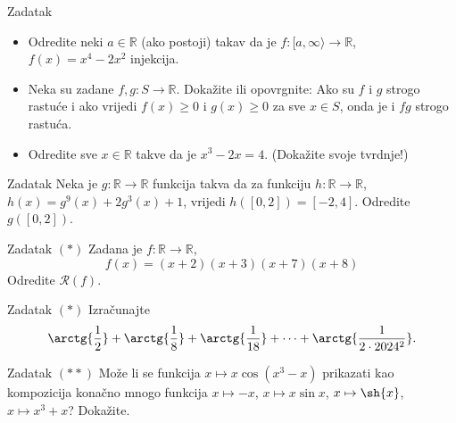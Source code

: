 \begin{exercise}{Zadatak} \textbf{}
\begin{itemize}
\item[a)] Odredite neki \(a\in\mathbb{R}\) (ako postoji) takav da je \(f : [a, \infty\rangle\to \mathbb{R}\), \(f(x)=x^4-2x^2\) injekcija.
\item[b)] Neka su zadane \(f, g : S\to \mathbb{R}\). Dokažite ili opovrgnite: Ako su \(f\) i \(g\) strogo rastuće i ako vrijedi \(f(x)\geq 0\) i \(g(x)\geq 0\) za sve \(x\in S\), onda je i \(fg\) strogo rastuća.
\item[c)] Odredite sve \(x\in \mathbb{R}\) takve da je \(x^3-2x=4\). (Dokažite svoje tvrdnje!)
\end{itemize}
\end{exercise}
\begin{exercise}{Zadatak}
Neka je \(g : \mathbb{R}\to \mathbb{R}\) funkcija takva da za funkciju \(h : \mathbb{R}\to \mathbb{R}\), \(h(x)=g^9(x)+2g^3(x)+1\), vrijedi \(h\left([0, 2]\right)=[-2, 4]\). Odredite \(g\left([0, 2]\right)\).
\end{exercise}
\begin{exercise}{Zadatak} \((*)\)
Zadana je \(f : \mathbb{R}\to \mathbb{R}\),
\[f(x)=(x+2)(x+3)(x+7)(x+8)\]
Odredite \(\mathcal{R}(f)\).
\end{exercise}
\begin{exercise}{Zadatak} \((*)\) Izračunajte
\[\arctg{\dfrac{1}{2}}+\arctg{\dfrac{1}{8}}+\arctg{\dfrac{1}{18}}+\dots+ \arctg{\dfrac{1}{2\cdot 2024^2}}.\]
\end{exercise}
\begin{exercise}{Zadatak} \((**)\)
Može li se funkcija \(x\mapsto x\cos(x^3-x)\) prikazati kao kompozicija konačno mnogo funkcija \(x\mapsto -x\), \(x\mapsto x\sin{x}\), \(x\mapsto \sh{x}\), \(x\mapsto x^3+x\)? Dokažite.
\end{exercise}
